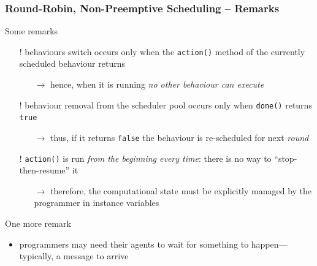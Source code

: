 \documentclass{beamer}\mode<presentation>{\usetheme{AMSCesenaPurpleAndGold}}
\begin{document}
\begin{frame}[c,allowframebreaks]\frametitle{Round-Robin, Non-Preemptive Scheduling -- Remarks}
    \begin{block}{Some remarks}
        \begin{itemize}
            \item[!] behaviours switch occurs only when the \texttt{action()} method of the currently scheduled behaviour returns
            \begin{itemize}
                \item[$\rightarrow$] hence, when it is running \emph{no other behaviour can execute}
            \end{itemize}
            \item[!] behaviour removal from the scheduler pool occurs only when \texttt{done()} returns \texttt{true}
            \begin{itemize}
                \item[$\rightarrow$] thus, if it returns \texttt{false} the behaviour is re-scheduled for next \emph{round}
            \end{itemize}
            \item[!] \texttt{action()} is run \emph{from the beginning every time}: there is no way to ``stop-then-resume'' it
            \begin{itemize}
                \item[$\rightarrow$] therefore, the computational state must be explicitly managed by the programmer in instance variables%
            \end{itemize}
        \end{itemize}
    \end{block}
    \begin{block}{One more remark}
        \begin{itemize}
            \item programmers may need their agents to wait for something to happen---typically, a message to arrive

\end{itemize}
\end{block}
\end{frame}
\end{document}
